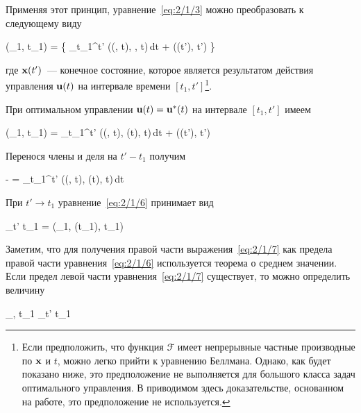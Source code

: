 Применяя этот принцип, уравнение~\ref{eq:2/1/3} можно преобразовать к следующему виду

    \optF(_1, t_1) =  \biggl\{ \int\limits_{t_1}^{t'} \funcL\bigl((, t), , t\bigr)\,dt + \optF\bigl((t'), t'\bigr) \biggr\} \text{,}
\eeq

где $\mathbf{x}(t')$~--- конечное состояние, которое является результатом действия управления $\mathbf{u}(t)$ на интервале времени $[t_1, t']$\footnote{ Если предположить, что функция $\mathcal{F}$ имеет непрерывные частные производные по $\mathbf{x}$ и $t$, можно легко прийти к уравнению Беллмана\cite{BELLMAN1}. Однако, как будет показано ниже, это предположение не выполняется для большого класса задач оптимального управления. В приводимом здесь доказательстве, основанном на работе\cite{TCHAMRAN}, это предположение не используется. }.

При оптимальном управлении $\mathbf{u}(t) = {\mathbf{u}^{*}}(t)$ на интервале $[t_1, t']$ имеем

    \optF(_1, t_1) = \int\limits_{t_1}^{t'} \funcL\bigl((\optU, t), \optU(t), t\bigr)\,dt + \optF\bigl((t'), t'\bigr) 
\eeq

Перенося члены и деля на $t' - t_1$ получим

    - =  \int\limits_{t_1}^{t'} \funcL\bigl((\optU, t), \optU(t), t\bigr)\,dt 
\eeq

При $t' \to t_1$ уравнение~\ref{eq:2/1/6} принимает вид

    \lim_{t' \to t_1}  = \funcL\bigl(_1, \optU(t_1), t_1\bigr) 
\eeq

Заметим, что для получения правой части выражения~\ref{eq:2/1/7} как предела правой части уравнения~\ref{eq:2/1/6} используется теорема о среднем значении\cite{FICHTENGOLZ}. Если предел левой части уравнения~\ref{eq:2/1/7} существует, то можно определить величину

    _{\optU, t_1} \eqdef \lim_{t' \to t_1}  
\eeq

